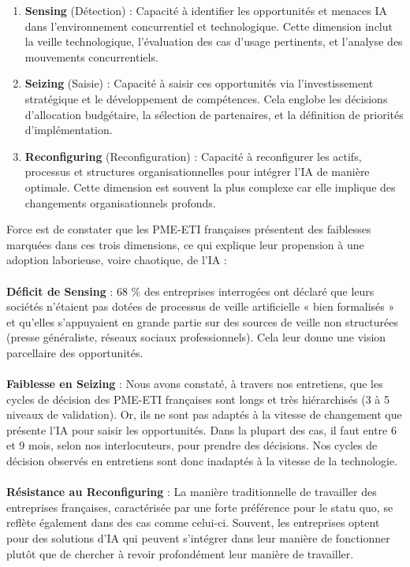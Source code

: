 \begin{enumerate}
    \item \textbf{Sensing} (Détection) : Capacité à identifier les opportunités et menaces IA dans l'environnement concurrentiel et technologique. Cette dimension inclut la veille technologique, l'évaluation des cas d'usage pertinents, et l'analyse des mouvements concurrentiels.
    
    \item \textbf{Seizing} (Saisie) : Capacité à saisir ces opportunités via l'investissement stratégique et le développement de compétences. Cela englobe les décisions d'allocation budgétaire, la sélection de partenaires, et la définition de priorités d'implémentation.
    
    \item \textbf{Reconfiguring} (Reconfiguration) : Capacité à reconfigurer les actifs, processus et structures organisationnelles pour intégrer l'IA de manière optimale. Cette dimension est souvent la plus complexe car elle implique des changements organisationnels profonds.
\end{enumerate}
\medskip
Force est de constater que les PME-ETI françaises présentent des faiblesses marquées dans ces trois dimensions, ce qui explique leur propension à une adoption laborieuse, voire chaotique, de l'IA :
\\\\
\textbf{Déficit de Sensing} : 68 \% des entreprises interrogées ont déclaré que leurs sociétés n’étaient pas dotées de processus de veille artificielle « bien formalisés » et qu’elles s’appuyaient en grande partie sur des sources de veille non structurées (presse généraliste, réseaux sociaux professionnels). Cela leur donne une vision parcellaire des opportunités.
\\\\
\textbf{Faiblesse en Seizing} : Nous avons constaté, à travers nos entretiens, que les cycles de décision des PME-ETI françaises sont longs et très hiérarchisés (3 à 5 niveaux de validation). Or, ils ne sont pas adaptés à la vitesse de changement que présente l'IA pour saisir les opportunités. Dans la plupart des cas, il faut entre 6 et 9 mois, selon nos interlocuteurs, pour prendre des décisions. Nos cycles de décision observés en entretiens sont donc inadaptés à la vitesse de la technologie.
\\\\
\textbf{Résistance au Reconfiguring} : La manière traditionnelle de travailler des entreprises françaises, caractérisée par une forte préférence pour le statu quo, se reflète également dans des cas comme celui-ci. Souvent, les entreprises optent pour des solutions d'IA qui peuvent s'intégrer dans leur manière de fonctionner plutôt que de chercher à revoir profondément leur manière de travailler.

